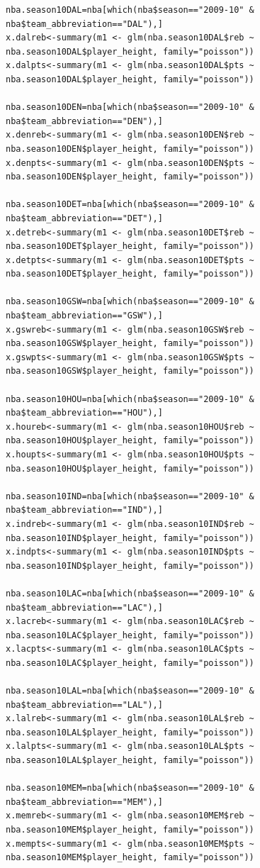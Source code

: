 \documentclass[11pt,letterpaper]{amsart}
\begin{document}
\begin{lstlisting}[breaklines]
nba.season10DAL=nba[which(nba$season=="2009-10" & nba$team_abbreviation=="DAL"),]
x.dalreb<-summary(m1 <- glm(nba.season10DAL$reb ~ nba.season10DAL$player_height, family="poisson"))
x.dalpts<-summary(m1 <- glm(nba.season10DAL$pts ~ nba.season10DAL$player_height, family="poisson"))

nba.season10DEN=nba[which(nba$season=="2009-10" & nba$team_abbreviation=="DEN"),]
x.denreb<-summary(m1 <- glm(nba.season10DEN$reb ~ nba.season10DEN$player_height, family="poisson"))
x.denpts<-summary(m1 <- glm(nba.season10DEN$pts ~ nba.season10DEN$player_height, family="poisson"))

nba.season10DET=nba[which(nba$season=="2009-10" & nba$team_abbreviation=="DET"),]
x.detreb<-summary(m1 <- glm(nba.season10DET$reb ~ nba.season10DET$player_height, family="poisson"))
x.detpts<-summary(m1 <- glm(nba.season10DET$pts ~ nba.season10DET$player_height, family="poisson"))

nba.season10GSW=nba[which(nba$season=="2009-10" & nba$team_abbreviation=="GSW"),]
x.gswreb<-summary(m1 <- glm(nba.season10GSW$reb ~ nba.season10GSW$player_height, family="poisson"))
x.gswpts<-summary(m1 <- glm(nba.season10GSW$pts ~ nba.season10GSW$player_height, family="poisson"))

nba.season10HOU=nba[which(nba$season=="2009-10" & nba$team_abbreviation=="HOU"),]
x.houreb<-summary(m1 <- glm(nba.season10HOU$reb ~ nba.season10HOU$player_height, family="poisson"))
x.houpts<-summary(m1 <- glm(nba.season10HOU$pts ~ nba.season10HOU$player_height, family="poisson"))

nba.season10IND=nba[which(nba$season=="2009-10" & nba$team_abbreviation=="IND"),]
x.indreb<-summary(m1 <- glm(nba.season10IND$reb ~ nba.season10IND$player_height, family="poisson"))
x.indpts<-summary(m1 <- glm(nba.season10IND$pts ~ nba.season10IND$player_height, family="poisson"))

nba.season10LAC=nba[which(nba$season=="2009-10" & nba$team_abbreviation=="LAC"),]
x.lacreb<-summary(m1 <- glm(nba.season10LAC$reb ~ nba.season10LAC$player_height, family="poisson"))
x.lacpts<-summary(m1 <- glm(nba.season10LAC$pts ~ nba.season10LAC$player_height, family="poisson"))

nba.season10LAL=nba[which(nba$season=="2009-10" & nba$team_abbreviation=="LAL"),]
x.lalreb<-summary(m1 <- glm(nba.season10LAL$reb ~ nba.season10LAL$player_height, family="poisson"))
x.lalpts<-summary(m1 <- glm(nba.season10LAL$pts ~ nba.season10LAL$player_height, family="poisson"))

nba.season10MEM=nba[which(nba$season=="2009-10" & nba$team_abbreviation=="MEM"),]
x.memreb<-summary(m1 <- glm(nba.season10MEM$reb ~ nba.season10MEM$player_height, family="poisson"))
x.mempts<-summary(m1 <- glm(nba.season10MEM$pts ~ nba.season10MEM$player_height, family="poisson"))


\end{lstlisting}
\end{document}
